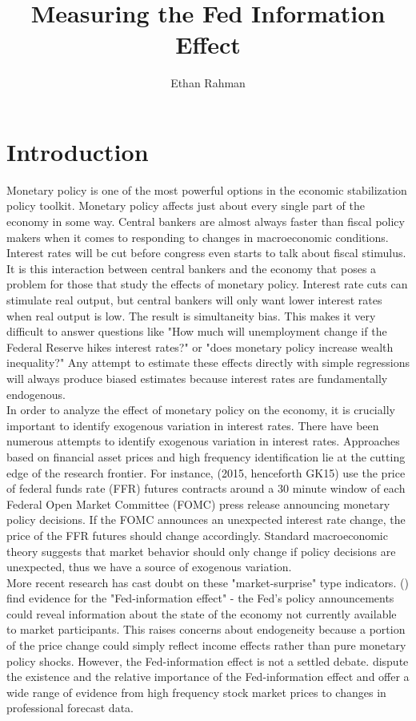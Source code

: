 \documentclass[a4paper,man,floatsintext,natbib]{apa6}
\title{Measuring the Fed Information Effect}
\author{Ethan Rahman}
\affiliation{Northern Illinois University - ECON 592}
\begin{document}
	\maketitle
	\section{Introduction}
	Monetary policy is one of the most powerful options in the economic stabilization policy toolkit. Monetary policy affects just about every single part of the economy in some way. Central bankers are almost always faster than fiscal policy makers when it comes to responding to changes in macroeconomic conditions. Interest rates will be cut before congress even starts to talk about fiscal stimulus. It is this interaction between central bankers and the economy that poses a problem for those that study the effects of monetary policy. Interest rate cuts can stimulate real output, but central bankers will only want lower interest rates when real output is low. The result is simultaneity bias. This makes it very difficult to answer questions like "How much will unemployment change if the Federal Reserve hikes interest rates?" or "does monetary policy increase wealth inequality?" Any attempt to estimate these effects directly with simple regressions will always produce biased estimates because interest rates are fundamentally endogenous.\\
	
	In order to analyze the effect of monetary policy on the economy, it is crucially important to identify exogenous variation in interest rates. There have been numerous attempts to identify exogenous variation in interest rates. Approaches based on financial asset prices and high frequency identification lie at the cutting edge of the research frontier. For instance, \citeauthor{Gertler2015} (2015, henceforth GK15) use the price of federal funds rate (FFR) futures contracts around a 30 minute window of each Federal Open Market Committee (FOMC) press release announcing monetary policy decisions. If the FOMC announces an unexpected interest rate change, the price of the FFR futures should change accordingly. Standard macroeconomic theory suggests that market behavior should only change if policy decisions are unexpected, thus we have a source of exogenous variation. \\ 
	
	More recent research has cast doubt on these "market-surprise" type indicators. \citeauthor{Nakamura2018} (\citeyear{Nakamura2018}) find evidence for the "Fed-information effect" - the Fed's policy announcements could reveal information about the state of the economy not currently available to market participants. This raises concerns about endogeneity because a portion of the price change could simply reflect income effects rather than pure monetary policy shocks. However, the Fed-information effect is not a settled debate. \cite{Bauer2020} dispute the existence and the relative importance of the Fed-information effect and offer a wide range of evidence from high frequency stock market prices to changes in professional forecast data.
	
\end{document}
